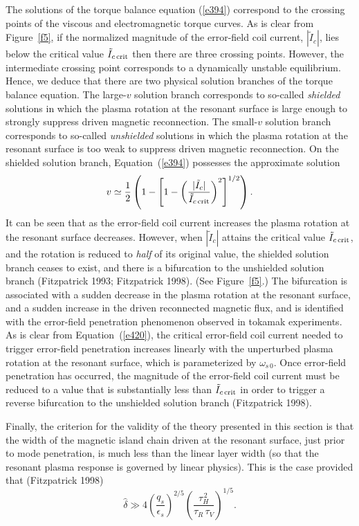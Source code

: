\documentclass[notitlepage,12pt]{article}
\begin{document}
The solutions of the torque balance equation (\ref{e394}) correspond to the crossing points of the viscous and electromagnetic torque
curves. As is clear from Figure~\ref{f5}, if the normalized magnitude of the error-field coil current, $|\tilde{I}_c|$, lies below
the critical value $\tilde{I}_{c\,{\rm crit}}$ then there are three crossing points. However, the intermediate crossing point corresponds to
a dynamically unstable equilibrium. Hence, we deduce that there are two physical solution branches of the torque
balance equation. The large-$v$ solution branch corresponds to  so-called {\em shielded}\/ solutions in which the plasma
rotation at the resonant surface is large enough to strongly suppress driven magnetic reconnection. The small-$v$
solution branch corresponds to so-called {\em unshielded}\/ solutions  in which the plasma rotation at the resonant surface is
too weak to suppress driven magnetic reconnection. 
On the shielded solution branch, Equation~(\ref{e394}) possesses the approximate solution
\begin{equation}
v \simeq \frac{1}{2}\left(1-\left[1-\left(\frac{|\tilde{I}_c|}{\tilde{I}_{c\,{\rm crit}}}\right)^2\right]^{1/2}
\right).
\end{equation}
It can be seen that as the error-field coil current increases  the plasma rotation at the resonant surface decreases. However, when
$|\tilde{I}_c|$ attains the critical value $\tilde{I}_{c\,{\rm crit}}$, and the rotation is reduced to {\em half}\/ of its
original value, the shielded solution branch ceases to exist, and there is a bifurcation to the unshielded solution branch (Fitzpatrick 1993;
Fitzpatrick 1998). (See Figure~\ref{f5}.)
The bifurcation is associated with a sudden decrease in the plasma rotation at the resonant surface, and a sudden
increase in the driven reconnected magnetic flux, and is identified with the error-field penetration phenomenon observed in tokamak
experiments. As is clear from Equation~(\ref{e420}), the critical error-field coil current needed to trigger error-field
penetration increases linearly with the unperturbed plasma rotation at the resonant surface, which is parameterized by $\omega_{s\,0}$. 
Once error-field penetration has occurred, the magnitude of the error-field coil current must be reduced to a value
that is substantially less than $\tilde{I}_{c\,{\rm crit}}$ in order to trigger a reverse bifurcation to the unshielded solution branch (Fitzpatrick 1998). 

Finally, the criterion for the validity of the theory presented in this section is that the width of the magnetic island
chain driven at the resonant surface, just prior to mode penetration, is much less than the linear layer width (so that the resonant
plasma response is governed by linear physics). This is the case provided that (Fitzpatrick 1998)
\begin{equation}
\hat{\delta}\gg 4\left(\frac{q_s}{\epsilon_s}\right)^{2/5}\left(\frac{\tau_H^{\,2}}{\tau_R\,\tau_V}\right)^{1/5}.
\end{equation}
\end{document}
